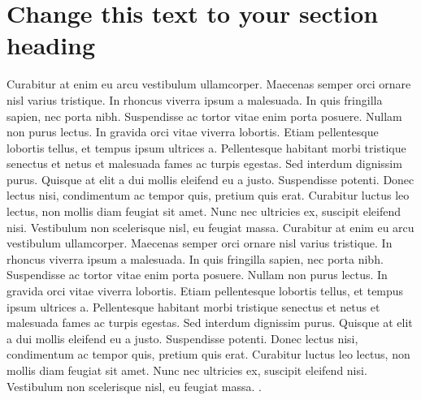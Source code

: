 \documentclass[11pt]{report}
\begin{document}
\section*{Change this text to your section heading }

Curabitur at enim eu arcu vestibulum ullamcorper. Maecenas semper orci ornare nisl varius tristique. In rhoncus viverra ipsum a malesuada. In quis fringilla sapien, nec porta nibh. Suspendisse ac tortor vitae enim porta posuere. Nullam non purus lectus. In gravida orci vitae viverra lobortis. Etiam pellentesque lobortis tellus, et tempus ipsum ultrices a. Pellentesque habitant morbi tristique senectus et netus et malesuada fames ac turpis egestas. Sed interdum dignissim purus. Quisque at elit a dui mollis eleifend eu a justo. Suspendisse potenti. Donec lectus nisi, condimentum ac tempor quis, pretium quis erat. Curabitur luctus leo lectus, non mollis diam feugiat sit amet. Nunc nec ultricies ex, suscipit eleifend nisi. Vestibulum non scelerisque nisl, eu feugiat massa. Curabitur at enim eu arcu vestibulum ullamcorper. Maecenas semper orci ornare nisl varius tristique. In rhoncus viverra ipsum a malesuada. In quis fringilla sapien, nec porta nibh. Suspendisse ac tortor vitae enim porta posuere. Nullam non purus lectus. In gravida orci vitae viverra lobortis. Etiam pellentesque lobortis tellus, et tempus ipsum ultrices a. Pellentesque habitant morbi tristique senectus et netus et malesuada fames ac turpis egestas. Sed interdum dignissim purus. Quisque at elit a dui mollis eleifend eu a justo. Suspendisse potenti. Donec lectus nisi, condimentum ac tempor quis, pretium quis erat. Curabitur luctus leo lectus, non mollis diam feugiat sit amet. Nunc nec ultricies ex, suscipit eleifend nisi. Vestibulum non scelerisque nisl, eu feugiat massa. \cite{dugan2005sports, fong2007systematic, majewski2006epidemiology, prodromos2007meta}. 
\end{document}
